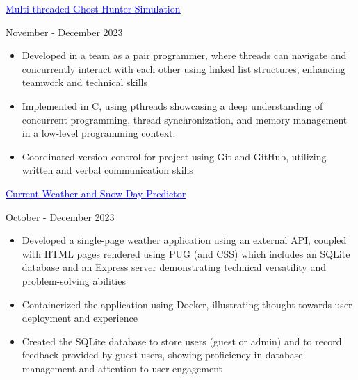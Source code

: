 \documentclass[a4paper,11pt]{article}
\begin{document}
\begin{minipage}{.65\linewidth}
     \href{https://github.com/JeremyFriesenGitHub/Multi-threaded-Ghost-Hunter-Simulation}{\textcolor{blue}{\uline{Multi-threaded Ghost Hunter Simulation}}}
 \end{minipage}
 \hfill %
 \begin{minipage}{.34\linewidth}
     \flushright
     November - December 2023
 \end{minipage}
 \begin{minipage}{\linewidth}
 \vspace{10pt}
 \begin{itemize}
     \item Developed in a team as a pair programmer, where threads can navigate and concurrently interact with each other using linked list structures, enhancing teamwork and technical skills
     \item Implemented in C, using pthreads showcasing a deep understanding of concurrent programming, thread synchronization, and memory management in a low-level programming context.
     \item Coordinated version control for project using Git and GitHub, utilizing written and verbal communication skills 
      \end{itemize}
        \vspace{1pt}
 \end{minipage}
\begin{minipage}{.65\linewidth}
\href{https://github.com/JeremyFriesenGitHub/Weather-App-and-Snow-day-Project}{\textcolor{blue}{\uline{Current Weather and Snow Day Predictor}}}                
\end{minipage}
\hfill
\begin{minipage}{.34\linewidth}
    \flushright
    October - December 2023
\end{minipage}
\begin{minipage}{\linewidth}
\vspace{10pt}
\begin{itemize}
    \item Developed a single-page weather application using an external API, coupled with HTML pages rendered using PUG (and CSS) which includes an SQLite database and an Express server demonstrating technical versatility and problem-solving abilities
    \item Containerized the application using Docker, illustrating thought towards user deployment and experience
    \item Created the SQLite database to store users (guest or admin) and to record feedback provided by guest users, showing proficiency in database management and attention to user engagement
  \end{itemize}
\end{minipage}
\end{document}
